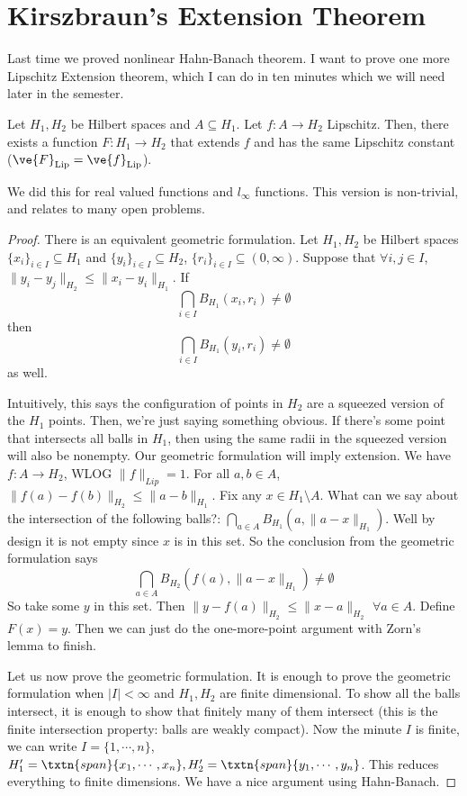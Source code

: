 \section{Kirszbraun's Extension Theorem}
Last time we proved nonlinear Hahn-Banach theorem. I want to prove one more Lipschitz Extension theorem, which I can do in ten minutes which we will need later in the semester. 

\begin{thm} \label{thm:kirszbraun}
Let $H_1, H_2$ be Hilbert spaces and $A \subseteq H_1$. Let $f: A \to H_2$ Lipschitz. Then, there exists a function $F: H_1 \to H_2$ that extends $f$ and has the same Lipschitz constant ($\ve{F}_{\text{Lip}}=\ve{f}_{\text{Lip}}$).
\end{thm}
We did this for real valued functions and $l_{\infty}$ functions. This version is non-trivial, and relates to many open problems. 
\begin{proof}
There is an equivalent geometric formulation.
Let $H_1, H_2$ be Hilbert spaces $\{x_i\}_{i \in I} \subseteq H_1$ and $\{y_i\}_{i \in I} \subseteq H_2$, $\{r_i\}_{i \in I} \subseteq (0, \infty)$. Suppose that $\forall i, j \in I$, $\|y_i - y_j\|_{H_2} \leq \|x_i - y_i\|_{H_1}$. If 
\[
\bigcap_{i \in I} B_{H_1}(x_i, r_i) \neq \emptyset
\]
then 
\[
\bigcap_{i \in I} B_{H_1}(y_i, r_i) \neq \emptyset
\]
as well.

Intuitively, this says the configuration of points in $H_2$ are a squeezed version of the $H_1$ points. Then, we're just saying something obvious. If there's some point that intersects all balls in $H_1$, then using the same radii in the squeezed version will also be nonempty.
Our geometric formulation will imply extension. We have $f: A \to H_2$, WLOG $\|f\|_{Lip} = 1$. For all $a, b \in A$, $\|f(a) - f(b)\|_{H_2} \leq \|a - b\|_{H_1}$. Fix any $x \in H_1 \setminus A$. What can we say about the intersection of the following balls?: $\bigcap_{a \in A} B_{H_1}(a, \|a - x\|_{H_1})$. Well by design it is not empty since $x$ is in this set. So the conclusion from the geometric formulation says 
\[
\bigcap_{a \in A} B_{H_2}\left(f(a), \|a - x\|_{H_1}\right) \neq \emptyset
\]
So take some $y$ in this set. Then $\|y - f(a)\|_{H_2} \leq \|x - a\|_{H_2}$ $\forall a \in A$. 
Define $F(x) = y$. Then we can just do the one-more-point argument with Zorn's lemma to finish. 

Let us now prove the geometric formulation. It is enough to prove the geometric formulation when $|I| < \infty$ and $H_1, H_2$ are finite dimensional. 
To show all the balls intersect, it is enough to show that finitely many of them intersect (this is the finite intersection property: balls are weakly compact). 
Now the minute $I$ is finite, we can write $I = \{1, \cdots, n\}$, $H_1' = \txtn{span}\{x_1, \cdots, x_n\}, H_2' = \txtn{span}\{y_1, \cdots, y_n\}$. This reduces everything to finite dimensions. 
We have a nice argument using Hahn-Banach.
\end{proof}

